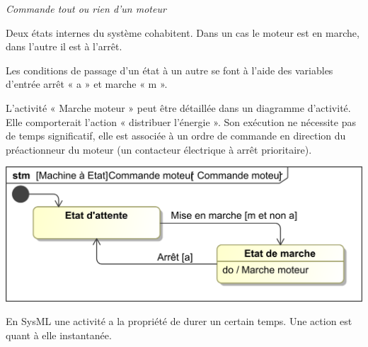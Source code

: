 \documentclass[10pt,fleqn]{article} %
\begin{document}
%
%
\begin{exemple}
\textit{Commande tout ou rien d'un moteur}

\vspace{.2cm}
\noindent
\begin{minipage}[c]{.48\linewidth}
Deux états internes du système cohabitent. Dans un cas le moteur est en marche, dans l’autre il est à l’arrêt.

Les conditions de passage d’un état à un autre se font à l’aide des variables d’entrée arrêt « a » et marche « m ».


L’activité « Marche moteur » peut être détaillée dans un diagramme d’activité. Elle comporterait l’action « distribuer l’énergie ». Son exécution ne nécessite pas de temps significatif, elle est associée à un ordre de commande en direction du préactionneur du moteur (un contacteur électrique à arrêt prioritaire).
\end{minipage} \hfill
\begin{minipage}[c]{.46\linewidth}
\begin{center}
\includegraphics[width=\textwidth]{images/Commandemoteur}
\end{center}
\end{minipage}

\end{exemple}


\begin{defi}

En SysML une activité a la propriété de durer un certain temps. Une action est quant à elle instantanée. 

\end{defi}
\end{document}
